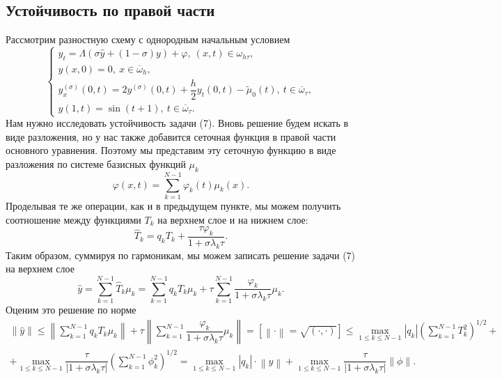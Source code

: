 \documentclass[a4paper, 12pt]{article}
\newcommand\Norm[1]{\left\| #1 \right\|}
\begin{document}
    	\subsection*{Устойчивость по правой части}
    	Рассмотрим разностную схему с однородным начальным условием
    	\begin{equation}
    		\begin{cases}
    			y_t = \Lambda(\sigma \hat y + (1-\sigma)y) + \varphi,\ (x,t)\in \omega_{h\tau},\\
    			y(x,0) = 0,\ x \in \overline \omega_h,\\
    			y_x^{(\sigma)}(0,t) = 2y^{(\sigma)}(0,t) + \dfrac h2 y_t(0,t) - \tilde \mu_0(t),\ t \in \overline \omega_\tau,\\ 
    			y(1,t) = \sin(t+1),\ t \in \overline \omega_\tau.
    		\end{cases}
    	\end{equation}
    	Нам нужно исследовать устойчивость задачи (7). Вновь решение будем искать в виде разложения, но у нас также добавится сеточная функция в правой части основного уравнения. Поэтому мы представим эту сеточную функцию в виде разложения по системе базисных функций $\mu_k$
    	$$\varphi(x,t) = \sum_{k=1}^{N-1}\varphi_k(t)\mu_k(x).$$
    	Проделывая те же операции, как и в предыдущем пункте, мы можем получить соотношение между функциями $T_k$ на верхнем слое и на нижнем слое:
    	\begin{equation}
    		\hat T_k = q_k T_k + \dfrac{\tau \varphi_k}{1 + \sigma \lambda_k \tau}.
    	\end{equation}
    	Таким образом, суммируя по гармоникам, мы можем записать решение задачи (7) на верхнем слое
    	$$\hat{{ y}} = \sum_{k=1}^{N-1}\hat T_k \mu_k = \sum_{k=1}^{N-1}q_kT_k\mu_k + \tau \sum_{k=1}^{N-1}\dfrac{\varphi_k}{1 + \sigma \lambda_k \tau}\mu_k.$$
    	Оценим это решение по норме
    	\begin{multline*}
    		\Norm {\hat{{ y}}}\leq \Norm{\sum_{k=1}^{N-1}q_kT_k\mu_k } + \tau \Norm{ \sum_{k=1}^{N-1}\dfrac{\varphi_k}{1 + \sigma \lambda_k \tau}\mu_k} = \left[\Norm{\cdot} = \sqrt{(\cdot, \cdot )}\right]\leq \underset{1\leq k \leq N-1}{\max} |q_k| \left(\sum_{k=1}^{N-1}T_k^2\right)^{1/2} + \\ +
    		\underset{1\leq k \leq N-1}{\max} \dfrac{\tau}{|1+\sigma \lambda_k \tau|} \left(\sum_{k=1}^{N-1}\phi_k^2\right)^{1/2} = \underset{1\leq k \leq N-1}{\max} |q_k|\cdot \Norm{{ y}}  +
    		\underset{1\leq k \leq N-1}{\max} \dfrac{\tau}{|1+\sigma \lambda_k \tau|} \Norm{\phi}.
    	\end{multline*}
\end{document}
